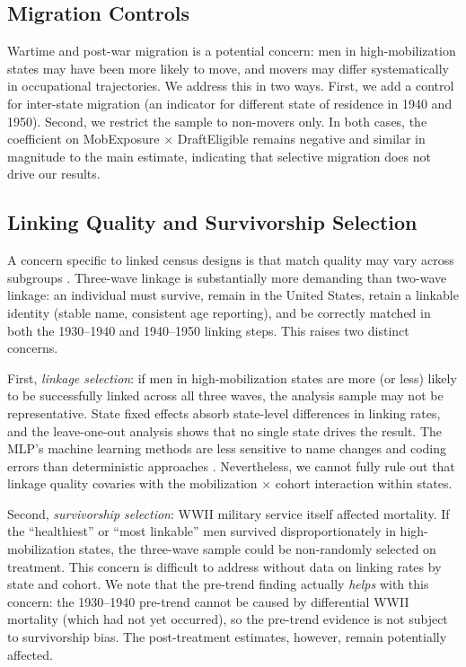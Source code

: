 \documentclass[12pt]{article}
\begin{document}
\subsection{Migration Controls}

Wartime and post-war migration is a potential concern: men in high-mobilization states may have been more likely to move, and movers may differ systematically in occupational trajectories. We address this in two ways. First, we add a control for inter-state migration (an indicator for different state of residence in 1940 and 1950). Second, we restrict the sample to non-movers only. In both cases, the coefficient on MobExposure $\times$ DraftEligible remains negative and similar in magnitude to the main estimate, indicating that selective migration does not drive our results.

\subsection{Linking Quality and Survivorship Selection}

A concern specific to linked census designs is that match quality may vary across subgroups \citep{bailey2022, abramitzky2021}. Three-wave linkage is substantially more demanding than two-wave linkage: an individual must survive, remain in the United States, retain a linkable identity (stable name, consistent age reporting), and be correctly matched in both the 1930--1940 and 1940--1950 linking steps. This raises two distinct concerns.

First, \textit{linkage selection}: if men in high-mobilization states are more (or less) likely to be successfully linked across all three waves, the analysis sample may not be representative. State fixed effects absorb state-level differences in linking rates, and the leave-one-out analysis shows that no single state drives the result. The MLP's machine learning methods are less sensitive to name changes and coding errors than deterministic approaches \citep{price2019}. Nevertheless, we cannot fully rule out that linkage quality covaries with the mobilization $\times$ cohort interaction within states.

Second, \textit{survivorship selection}: WWII military service itself affected mortality. If the ``healthiest'' or ``most linkable'' men survived disproportionately in high-mobilization states, the three-wave sample could be non-randomly selected on treatment. This concern is difficult to address without data on linking rates by state and cohort. We note that the pre-trend finding actually \textit{helps} with this concern: the 1930--1940 pre-trend cannot be caused by differential WWII mortality (which had not yet occurred), so the pre-trend evidence is not subject to survivorship bias. The post-treatment estimates, however, remain potentially affected.
\end{document}
